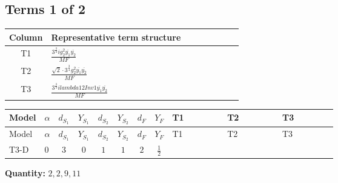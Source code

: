 \documentclass[8pt]{article}
\begin{document}
\begin{landscape}
\subsection*{Terms 1 of 2}
\begin{center}
\begin{tabular}{@{}c >{\raggedright\arraybackslash}p{0.82\linewidth}@{}}
\toprule
Column & Representative term structure \\
\midrule
T1 & \(\displaystyle \frac{3^{\frac{3}{4}} i g_{2}^{2} \overline{y_{1}} \overline{y_{2}}}{MF}\) \\
\midrule
T2 & \(\displaystyle \frac{\sqrt{2} \cdot 3^{\frac{3}{4}} g_{2}^{2} \overline{y_{1}} \overline{y_{2}}}{MF}\) \\
\midrule
T3 & \(\displaystyle \frac{3^{\frac{3}{4}} i lambda12Inv1 \overline{y_{1}} \overline{y_{2}}}{MF}\) \\
\midrule
\bottomrule
\end{tabular}
\end{center}
\smallskip
\tiny
\begin{longtable}{@{}llcccccc >{\raggedright\arraybackslash}p{0.21\linewidth} >{\raggedright\arraybackslash}p{0.21\linewidth} >{\raggedright\arraybackslash}p{0.21\linewidth}@{}}
\toprule
Model & $\alpha$ & $d_{S_1}$ & $Y_{S_1}$ & $d_{S_2}$ & $Y_{S_2}$ & $d_F$ & $Y_F$ & T1 & T2 & T3 \\
\midrule
\endfirsthead
\toprule
Model & $\alpha$ & $d_{S_1}$ & $Y_{S_1}$ & $d_{S_2}$ & $Y_{S_2}$ & $d_F$ & $Y_F$ & T1 & T2 & T3 \\
\midrule
\endhead
T3-D & $0$ & $3$ & $0$ & $1$ & $1$ & $2$ & $\frac{1}{2}$ & \scriptsize\adjustbox{max width=\linewidth}{$\begin{gathered} - \frac{17 \cdot 3^{\frac{3}{4}} i g_{2}^{2} \overline{y_{1}} \overline{y_{2}}}{24 MF}\end{gathered}$} & \scriptsize\adjustbox{max width=\linewidth}{$\begin{gathered} - \frac{\sqrt{2} \cdot 3^{\frac{3}{4}} g_{2}^{2} \overline{y_{1}} \overline{y_{2}}}{3 MF}\end{gathered}$} & \scriptsize\adjustbox{max width=\linewidth}{$\begin{gathered} - \frac{3^{\frac{3}{4}} i lambda12Inv1 \overline{y_{1}} \overline{y_{2}}}{6 MF}\end{gathered}$} \\
\midrule
\bottomrule
\end{longtable}
\clearpage
\noindent\textbf{Quantity: }$\mathrm{2,2,9,11}$\par\smallskip

\end{landscape}
\end{document}

